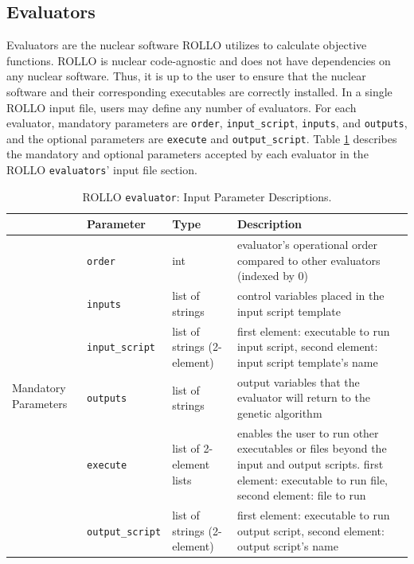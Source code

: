 \subsection{Evaluators}
Evaluators are the nuclear software \gls{ROLLO} utilizes to calculate objective functions. 
\gls{ROLLO} is nuclear code-agnostic and does not have dependencies on any 
nuclear software.
Thus, it is up to the user to ensure that the nuclear software and their corresponding 
executables are correctly installed. 
In a single \gls{ROLLO} input file, users may define any number of evaluators. 
For each evaluator, mandatory parameters are \texttt{order}, \texttt{input\_script}, 
\texttt{inputs}, and \texttt{outputs}, and the optional parameters are
\texttt{execute} and \texttt{output\_script}. 
Table \ref{tab:evaluator-inputs} describes the mandatory and optional parameters 
accepted by each evaluator in the ROLLO \texttt{evaluators}' input file section.  
\begin{table}[]
    \centering
    \onehalfspacing
    \caption{\acrfull{ROLLO} \texttt{evaluator}: Input Parameter Descriptions.}
	\label{tab:evaluator-inputs}
    \footnotesize
    \begin{tabular}{l|lp{2.5cm}p{7cm}}
    \hline
    & \textbf{Parameter} & \textbf{Type} & \textbf{Description} \\
    \hline
    \multirow{9}{2cm}{Mandatory Parameters} & \texttt{order} & int 
    & evaluator's operational order compared to other evaluators (indexed by 0) \\
    \cline{2-4}
    & \texttt{inputs} & list of strings & control variables placed in the input script template \\
    \cline{2-4}
    & \texttt{input\_script} & list of strings (2-element) & first element: executable to run input script, 
    second element: input script template's name \\
    \cline{2-4}
    & \texttt{outputs} & list of strings & output variables that the evaluator will return to the genetic algorithm \\
    \hline
    \multirow{4}{2cm}{Optional Parameters} & \texttt{execute} & list of 2-element lists &
    enables the user to run other executables or files beyond the input and output scripts. first element: executable to run file, 
    second element: file to run \\
    \cline{2-4}
    & \texttt{output\_script} & list of strings (2-element) & first element: executable to run output script, 
    second element: output script's name \\
    \hline 
    \end{tabular}
    \end{table}

